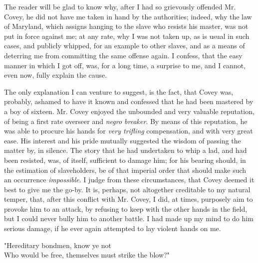 The reader will be glad to know why, after I had {}so grievously
offended Mr. Covey, he did not have me taken in hand by the authorities;
indeed, why the law of Maryland, which assigns hanging to the slave who
resists his master, was not put in force against me; at any rate, why I
was not taken up, as is usual in such cases, and publicly whipped, for
an example to other slaves, and as a means of deterring me from
committing the same offense again. I confess, that the easy manner in
which I got off, was, for a long time, a surprise to me, and I cannot,
even now, fully explain the cause.

The only explanation I can venture to suggest, is the fact, that Covey
was, probably, ashamed to have it known and confessed that he had been
mastered by a boy of sixteen. Mr. Covey enjoyed the unbounded and very
valuable reputation, of being a first rate overseer and \emph{negro
breaker}. By means of this reputation, he was able to procure his hands
for \emph{very trifling} compensation, and with very great ease. His
interest and his pride mutually suggested the wisdom of passing the
matter by, in silence. The story that he had undertaken to whip a lad,
and had been resisted, was, of itself, sufficient to damage him; for his
bearing should, in the estimation of slaveholders, be of that imperial
order that should make such an occurrence \emph{impossible}. I judge
from these circumstances, that Covey deemed it best to give me the
go-by. It is, perhaps, not altogether creditable to my natural temper,
that, after this conflict with Mr. Covey, I did, at times, purposely aim
to provoke him to an attack, by refusing to keep with the other hands in
the field, {}but I could never bully him to another battle. I had made
up my mind to do him serious damage, if he ever again attempted to lay
violent hands on me.

{"}Hereditary bondmen, know ye not\\
Who would be free, themselves must strike the blow?"
